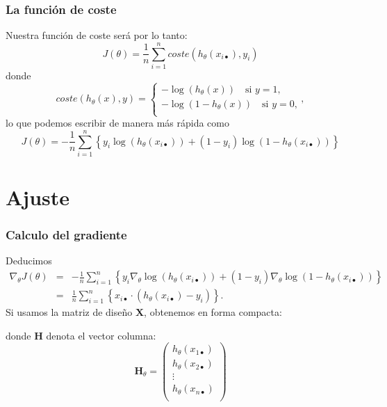 \documentclass{beamer}
\begin{document}
\begin{frame}\frametitle{La función de coste}
  Nuestra función de coste será por lo tanto:
  $$J(\theta)=\frac 1 n\sum_{i=1}^n coste(h_\theta(x_{i\bullet}),y_i)$$
donde 
$$
coste(h_\theta(x),y)= \left\{
\begin{array}{l}
  -\log(h_\theta(x))\quad \mbox{si $y=1$,}\\
  -\log(1-h_\theta(x))\quad \mbox{si $y=0$,}\\
\end{array}\right.,
$$ 
lo que podemos escribir de manera más rápida como
$$J(\theta)=- \frac 1 n\sum_{i=1}^n \left\{y_i\log(h_\theta(x_{i\bullet}))+(1-y_i)\log(1-h_\theta(x_{i\bullet}))\right\}$$
  
\end{frame}
\section{Ajuste}
\begin{frame}\frametitle{Calculo  del gradiente}
Deducimos 
  \begin{eqnarray*}
    \nabla_\theta J(\theta)&=&- \frac 1 n\sum_{i=1}^n \left\{y_i\nabla_\theta\log(h_\theta(x_{i\bullet}))+(1-y_i)\nabla_\theta\log(1-h_\theta(x_{i\bullet}))\right\}\\
    &=& \frac 1 n\sum_{i=1}^n \left\{x_{i\bullet}\cdot (h_\theta(x_{i\bullet})-y_i)\right\}.
  \end{eqnarray*}
Si usamos la matriz de diseño $\mathbf{X}$, 
  obtenemos  en forma compacta:
   \begin{center}
    \end{center}
 \scriptsize donde $\mathbf{H}$ denota el vector columna:
$$\mathbf{H}_\theta=\left(
\begin{array}{l}
  h_\theta(x_{1\bullet})\\
  h_\theta(x_{2\bullet})\\
  \vdots\\
  h_\theta(x_{n\bullet})\\
\end{array}\right)$$
\end{frame}
\end{document}
